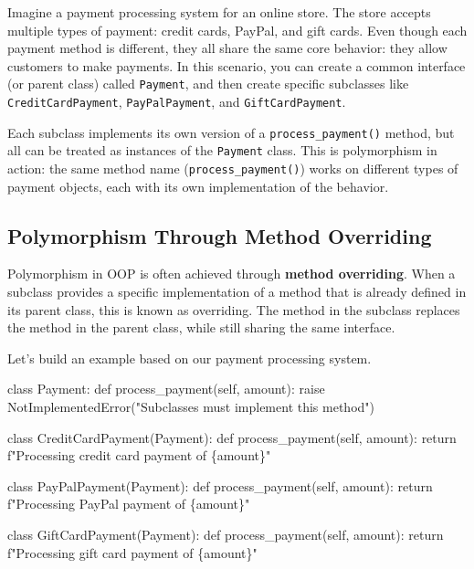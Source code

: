 \documentclass[
  letterpaper,
  DIV=11,
  numbers=noendperiod]{scrreprt}
\newenvironment{Shaded}{\begin{snugshade}}{\end{snugshade}}
\newcommand{\ControlFlowTok}[1]{\textcolor[rgb]{0.00,0.23,0.31}{#1}}
\newcommand{\KeywordTok}[1]{\textcolor[rgb]{0.00,0.23,0.31}{#1}}
\newcommand{\NormalTok}[1]{\textcolor[rgb]{0.00,0.23,0.31}{#1}}
\newcommand{\PreprocessorTok}[1]{\textcolor[rgb]{0.68,0.00,0.00}{#1}}
\newcommand{\SpecialCharTok}[1]{\textcolor[rgb]{0.37,0.37,0.37}{#1}}
\newcommand{\SpecialStringTok}[1]{\textcolor[rgb]{0.13,0.47,0.30}{#1}}
\newcommand{\StringTok}[1]{\textcolor[rgb]{0.13,0.47,0.30}{#1}}
\newcommand{\VariableTok}[1]{\textcolor[rgb]{0.07,0.07,0.07}{#1}}
\begin{document}
Imagine a payment processing system for an online store. The store
accepts multiple types of payment: credit cards, PayPal, and gift cards.
Even though each payment method is different, they all share the same
core behavior: they allow customers to make payments. In this scenario,
you can create a common interface (or parent class) called
\texttt{Payment}, and then create specific subclasses like
\texttt{CreditCardPayment}, \texttt{PayPalPayment}, and
\texttt{GiftCardPayment}.

Each subclass implements its own version of a
\texttt{process\_payment()} method, but all can be treated as instances
of the \texttt{Payment} class. This is polymorphism in action: the same
method name (\texttt{process\_payment()}) works on different types of
payment objects, each with its own implementation of the behavior.

\hypertarget{polymorphism-through-method-overriding}{%
\subsection{Polymorphism Through Method
Overriding}\label{polymorphism-through-method-overriding}}

Polymorphism in OOP is often achieved through \textbf{method
overriding}. When a subclass provides a specific implementation of a
method that is already defined in its parent class, this is known as
overriding. The method in the subclass replaces the method in the parent
class, while still sharing the same interface.

Let's build an example based on our payment processing system.

\begin{Shaded}
\begin{Highlighting}[]
\KeywordTok{class}\NormalTok{ Payment:}
    \KeywordTok{def}\NormalTok{ process\_payment(}\VariableTok{self}\NormalTok{, amount):}
        \ControlFlowTok{raise} \PreprocessorTok{NotImplementedError}\NormalTok{(}\StringTok{"Subclasses must implement this method"}\NormalTok{)}

\KeywordTok{class}\NormalTok{ CreditCardPayment(Payment):}
    \KeywordTok{def}\NormalTok{ process\_payment(}\VariableTok{self}\NormalTok{, amount):}
        \ControlFlowTok{return} \SpecialStringTok{f"Processing credit card payment of }\SpecialCharTok{\{}\NormalTok{amount}\SpecialCharTok{\}}\SpecialStringTok{"}

\KeywordTok{class}\NormalTok{ PayPalPayment(Payment):}
    \KeywordTok{def}\NormalTok{ process\_payment(}\VariableTok{self}\NormalTok{, amount):}
        \ControlFlowTok{return} \SpecialStringTok{f"Processing PayPal payment of }\SpecialCharTok{\{}\NormalTok{amount}\SpecialCharTok{\}}\SpecialStringTok{"}

\KeywordTok{class}\NormalTok{ GiftCardPayment(Payment):}
    \KeywordTok{def}\NormalTok{ process\_payment(}\VariableTok{self}\NormalTok{, amount):}
        \ControlFlowTok{return} \SpecialStringTok{f"Processing gift card payment of }\SpecialCharTok{\{}\NormalTok{amount}\SpecialCharTok{\}}\SpecialStringTok{"}
\end{Highlighting}
\end{Shaded}
\end{document}
